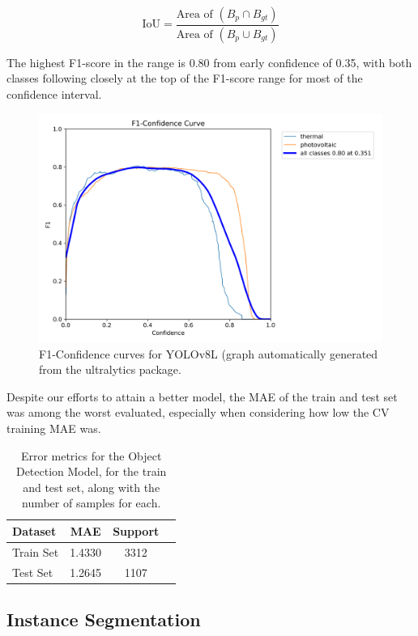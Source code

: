 \documentclass[conference]{IEEEtran}
\begin{document}
\[
\text{IoU} = \frac{\text{Area of } (B_p \cap B_{gt})}{\text{Area of } (B_p \cup B_{gt})}
\]

The highest F1-score in the range is 0.80 from early confidence of 0.35, with both classes following closely at the top of the F1-score range for most of the confidence interval.

\begin{figure}[H]
    \centering
    \includegraphics[width=1\linewidth]{assets/model03_yolof1.png}
    \caption{F1-Confidence curves for YOLOv8L (graph automatically generated from the ultralytics package.}
    \label{fig:model03_yolof1}
\end{figure}

Despite our efforts to attain a better model, the MAE of the train and test set was among the worst evaluated, especially when considering how low the CV training MAE was.

\begin{table}[H]
\centering
\caption{Error metrics for the Object Detection Model, for the train and test set, along with the number of samples for each.}
\label{tab:model03_results}
\begin{tabular}{lccc}
\toprule
\textbf{Dataset} & \textbf{MAE} & \textbf{Support} \\
\midrule
Train Set & 1.4330 & 3312 \\
Test Set & 1.2645 & 1107 \\
\bottomrule
\end{tabular}
\end{table}

\subsection{Instance Segmentation}
\end{document}
